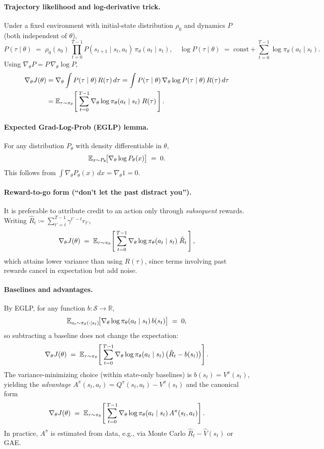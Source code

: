 \paragraph{Trajectory likelihood and log-derivative trick.}
Under a fixed environment with initial-state distribution $\rho_0$ and dynamics $P$ (both independent of $\theta$),
\[
P(\tau \mid \theta)
\;=\; \rho_0(s_0)\,\prod_{t=0}^{T-1} P(s_{t+1}\mid s_t,a_t)\,\pi_\theta(a_t\mid s_t),
\quad
\log P(\tau \mid \theta)
\;=\; \text{const} + \sum_{t=0}^{T-1}\log \pi_\theta(a_t\mid s_t).
\]
Using $\nabla_\theta P = P \,\nabla_\theta \log P$,
\begin{align*}
\nabla_\theta J(\theta)
&= \nabla_\theta \int P(\tau\mid\theta)\,R(\tau)\,d\tau
= \int P(\tau\mid\theta)\,\nabla_\theta \log P(\tau\mid\theta)\,R(\tau)\,d\tau \\
&= \mathbb{E}_{\tau\sim\pi_\theta}\!\left[\,\sum_{t=0}^{T-1} \nabla_\theta \log \pi_\theta(a_t\mid s_t)\; R(\tau)\,\right].
\end{align*}

\paragraph{Expected Grad-Log-Prob (EGLP) lemma.}
For any distribution $P_\theta$ with density differentiable in $\theta$,
\[
\mathbb{E}_{x\sim P_\theta}\!\big[\nabla_\theta \log P_\theta(x)\big] \;=\; 0.
\]
This follows from $\int \nabla_\theta P_\theta(x)\,dx = \nabla_\theta 1 = 0$.

\paragraph{Reward-to-go form (``don’t let the past distract you'').}
It is preferable to attribute credit to an action only through \emph{subsequent} rewards. Writing
$\hat R_t \coloneqq \sum_{t'=t}^{T-1} \gamma^{t'-t} r_{t'}$,
\[
\nabla_\theta J(\theta)
\;=\;
\mathbb{E}_{\tau\sim\pi_\theta}\!\left[\,\sum_{t=0}^{T-1} \nabla_\theta \log \pi_\theta(a_t\mid s_t)\;\hat R_t\,\right],
\]
which attains lower variance than using $R(\tau)$, since terms involving past rewards cancel in expectation but add noise.

\paragraph{Baselines and advantages.}
By EGLP, for any function $b:\mathcal{S}\!\to\!\mathbb{R}$,
\[
\mathbb{E}_{a_t\sim \pi_\theta(\cdot\mid s_t)}\!\big[\nabla_\theta \log \pi_\theta(a_t\mid s_t)\, b(s_t)\big] \;=\; 0,
\]
so subtracting a baseline does not change the expectation:
\[
\nabla_\theta J(\theta)
\;=\;
\mathbb{E}_{\tau\sim\pi_\theta}\!\left[\,\sum_{t=0}^{T-1} \nabla_\theta \log \pi_\theta(a_t\mid s_t)\,\big(\hat R_t - b(s_t)\big)\right].
\]
The variance-minimizing choice (within state-only baselines) is $b(s_t)=V^{\pi}(s_t)$, yielding the \emph{advantage} $A^{\pi}(s_t,a_t)=Q^{\pi}(s_t,a_t)-V^{\pi}(s_t)$ and the canonical form
\[
\nabla_\theta J(\theta)
\;=\;
\mathbb{E}_{\tau\sim\pi_\theta}\!\left[\,\sum_{t=0}^{T-1} \nabla_\theta \log \pi_\theta(a_t\mid s_t)\, A^{\pi}(s_t,a_t)\right].
\]
In practice, $A^{\pi}$ is estimated from data, e.g., via Monte Carlo $\hat R_t - \hat V(s_t)$ or GAE.

